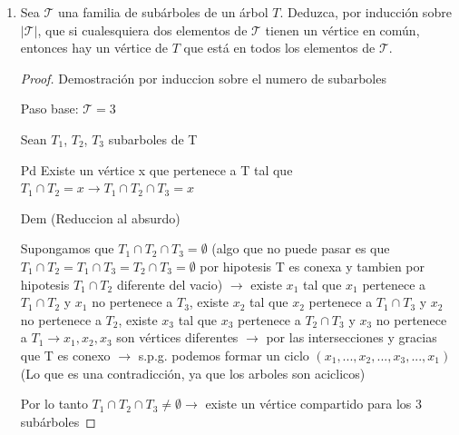 \documentclass{article}
\begin{document}
\begin{enumerate}
\begin{proof}
\begin{itemize}
\begin{itemize}
      \item[$\Leftarrow$)] 
      \end{itemize}
    \end{itemize}
    De los casos anterior concluimos que $G$ es $k$-partita completa si y
    s\'olo si no contiene a $K_{k+1}$ ni a $\overline{P_3}$ como subgr\'aficas
    inducidas.
  \end{proof}

  Ejercicio de la Tarea 4

  $\blacktriangleright$ Ejercicio extra 3
  
   \item Sea $\mathcal{T}$ una familia de sub\'arboles
      de un \'arbol $T$.   Deduzca, por inducci\'on sobre
      $|\mathcal{T}|$, que si cualesquiera dos elementos
      de $\mathcal{T}$ tienen un v\'ertice en com\'un,
      entonces hay un v\'ertice de $T$ que est\'a en
      todos los elementos de $\mathcal{T}$.
      
  \begin{proof} 
      Demostración por induccion sobre el numero de subarboles
      
  Paso base: $\mathcal{T} = 3$
  
  Sean $T_1$, $T_2$, $T_3$ subarboles de T 
  
  Pd Existe  un vértice x que pertenece a T tal que $T_1 \cap T_2=x \rightarrow  T_1 \cap T_2 \cap T_3 = x$ 
  
  Dem (Reduccion al absurdo)
  
  Supongamos que $T_1 \cap T_2 \cap T_3 = \emptyset$ (algo que no puede pasar es que $T_1 \cap T_2 = T_1 \cap T_3 = T_2 \cap T_3  = \emptyset$ por hipotesis T es conexa y tambien por hipotesis $T_1 \cap T_2$ diferente del vacio) $\rightarrow$ existe $x_1$ tal que $x_1$ pertenece a $T_1 \cap T_2$ y $x_1$ no pertenece a $T_3$, existe $x_2$ tal que $x_2$ pertenece a $T_1 \cap T_3$ y $x_2$ no pertenece a $T_2$, existe $x_3$ tal que $x_3$ pertenece a $T_2 \cap T_3$ y $x_3$ no pertenece a $T_1  \rightarrow x_1, x_2, x_3$ son vértices diferentes $\rightarrow$ por las intersecciones  y gracias que T  es conexo  $\rightarrow$ s.p.g. podemos formar un ciclo $(x_1, ... ,x_2, ... ,x_3, ...,x_1)$ (Lo que es una contradicción, ya que los arboles son aciclicos)
  
  Por lo tanto $T_1 \cap T_2 \cap T_3   \neq
   \emptyset \rightarrow$ existe un vértice compartido para los 3 subárboles
   

\end{proof}
\end{enumerate}
\end{document}
